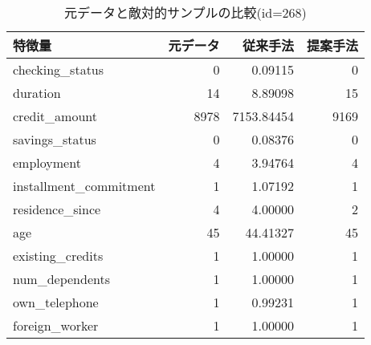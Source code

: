 \begin{table}[H]
    \centering
    \caption{元データと敵対的サンプルの比較(id=268)}
    \begin{tabular}{|l|r|r|r|} \hline
        特徴量 & 元データ & 従来手法 & 提案手法 \\ \hline
        checking\_status & 0 & 0.09115 & 0 \\ \hline
        duration & 14 & 8.89098 & 15 \\ \hline
        credit\_amount & 8978 & 7153.84454 & 9169 \\ \hline
        savings\_status & 0 & 0.08376 & 0 \\ \hline
        employment & 4 & 3.94764 & 4 \\ \hline
        installment\_commitment & 1 & 1.07192 & 1 \\ \hline
        residence\_since & 4 & 4.00000 & 2 \\ \hline
        age & 45 & 44.41327 & 45 \\ \hline
        existing\_credits & 1 & 1.00000 & 1 \\ \hline
        num\_dependents & 1 & 1.00000 & 1 \\ \hline
        own\_telephone & 1 & 0.99231 & 1 \\ \hline
        foreign\_worker & 1 & 1.00000 & 1 \\ \hline
    \end{tabular}
\end{table}


% 
% 
